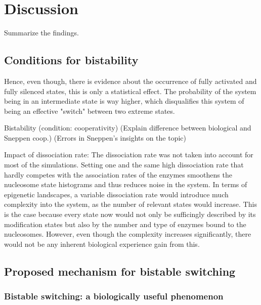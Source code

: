 \chapter{Discussion}
    \label{cha:discussion}
    \begin{itemize}
        {
            \color{red}
            \item Summarize the findings.
        }
    \end{itemize}

    \section{Conditions for bistability}
        Hence, even though, there is evidence about the occurrence of fully activated and fully silenced states, this is only a statistical effect. The probability of the system being in an intermediate state is way higher, which disqualifies this system of being an effective "switch" between two extreme states.

        \begin{itemize}
            {
                \color{red}
                \item Bistability (condition: cooperativity) (Explain difference between biological and Sneppen coop.) (Errors in Sneppen's insights on the topic)
                \item Impact of dissociation rate: The dissociation rate was not taken into account for most of the simulations. Setting one and the same high dissociation rate that hardly competes with the association rates of the enzymes smoothens the nucleosome state histograms and thus reduces noise in the system. In terms of epigenetic landscapes, a variable dissociation rate would introduce much complexity into the system, as the number of relevant states would increase. This is the case because every state now would not only be sufficingly described by its modification states but also by the number and type of enzymes bound to the nucleosomes. However, even though the complexity increases significantly, there would not be any inherent biological experience gain from this.
            }
        \end{itemize}
    \section{Proposed mechanism for bistable switching}
        \subsection{Bistable switching: a biologically useful phenomenon}

